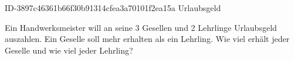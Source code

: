 \begin{exercise}
      {ID-3897c46361b66f30b91314cfea3a70101f2ea15a}
      {Urlaubsgeld}
  \ifproblem\problem\par
    Ein Handwerksmeister will an seine 3 Gesellen und 2 Lehrlinge 
    Urlaubsgeld auszahlen. Ein Geselle soll  mehr erhalten als ein
    Lehrling. Wie viel erhält jeder Geselle und wie viel jeder Lehrling?
  \fi
\end{exercise}
